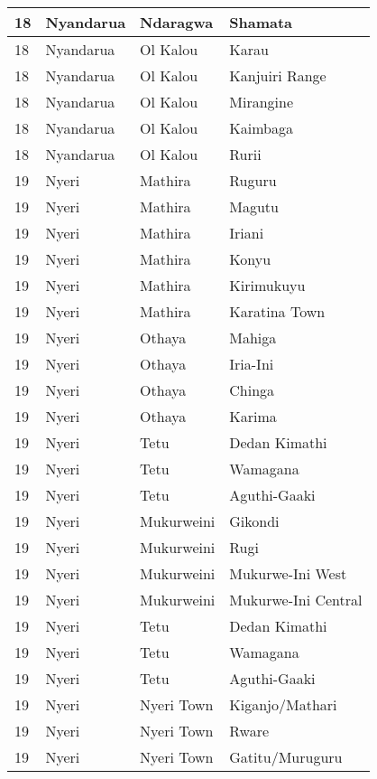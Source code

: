 \begin{table}[!ht]
\begin{tabular}{|l|l|l|l|}
        18 & Nyandarua & Ndaragwa & Shamata \\ \hline
        18 & Nyandarua & Ol Kalou & Karau \\ \hline
        18 & Nyandarua & Ol Kalou & Kanjuiri Range \\ \hline
        18 & Nyandarua & Ol Kalou & Mirangine \\ \hline
        18 & Nyandarua & Ol Kalou & Kaimbaga \\ \hline
        18 & Nyandarua & Ol Kalou & Rurii \\ \hline
        19 & Nyeri & Mathira & Ruguru \\ \hline
        19 & Nyeri & Mathira & Magutu \\ \hline
        19 & Nyeri & Mathira & Iriani \\ \hline
        19 & Nyeri & Mathira & Konyu \\ \hline
        19 & Nyeri & Mathira & Kirimukuyu \\ \hline
        19 & Nyeri & Mathira & Karatina Town \\ \hline
        19 & Nyeri & Othaya & Mahiga \\ \hline
        19 & Nyeri & Othaya & Iria-Ini \\ \hline
        19 & Nyeri & Othaya & Chinga \\ \hline
        19 & Nyeri & Othaya & Karima \\ \hline
        19 & Nyeri & Tetu & Dedan Kimathi \\ \hline
        19 & Nyeri & Tetu & Wamagana \\ \hline
        19 & Nyeri & Tetu & Aguthi-Gaaki \\ \hline
        19 & Nyeri & Mukurweini & Gikondi \\ \hline
        19 & Nyeri & Mukurweini & Rugi \\ \hline
        19 & Nyeri & Mukurweini & Mukurwe-Ini West \\ \hline
        19 & Nyeri & Mukurweini & Mukurwe-Ini Central \\ \hline
        19 & Nyeri & Tetu & Dedan Kimathi \\ \hline
        19 & Nyeri & Tetu & Wamagana \\ \hline
        19 & Nyeri & Tetu & Aguthi-Gaaki \\ \hline
        19 & Nyeri & Nyeri Town & Kiganjo/Mathari \\ \hline
        19 & Nyeri & Nyeri Town & Rware \\ \hline
        19 & Nyeri & Nyeri Town & Gatitu/Muruguru \\ \hline

\end{tabular}
\end{table}
